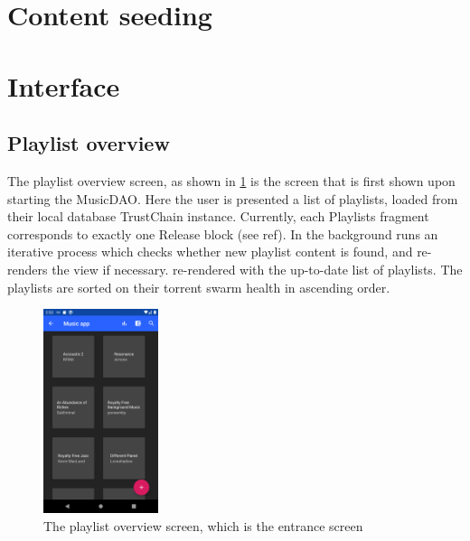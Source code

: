 \section{Content seeding}
\section{Interface}
\subsection{Playlist overview}
The playlist overview screen, as shown in \ref{fig:screenshot-home} is the screen that is first shown upon starting the MusicDAO. Here the user is presented a list of playlists, loaded from their local database TrustChain instance. Currently, each Playlists fragment corresponds to exactly one Release block (see ref). In the background runs an iterative process which checks whether new playlist content is found, and re-renders the view if necessary.  re-rendered with the up-to-date list of playlists. The playlists are sorted on their torrent swarm health in ascending order. 
\begin{figure}
    \includegraphics[width=0.3\textwidth]{implementation/screenshot-home.png}
    \caption{The playlist overview screen, which is the entrance screen}
    \label{fig:screenshot-home}
\end{figure}

